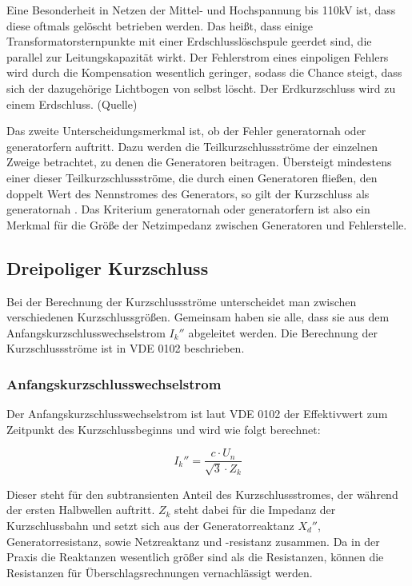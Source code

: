 \documentclass{scrartcl}
\begin{document}
\begin{onehalfspace}
Eine Besonderheit in Netzen der Mittel- und Hochspannung bis 110kV ist, dass diese oftmals gelöscht betrieben werden. Das heißt, dass einige Transformatorsternpunkte mit einer Erdschlusslöschspule geerdet sind, die parallel zur Leitungskapazität wirkt. Der Fehlerstrom eines einpoligen Fehlers wird durch die Kompensation wesentlich geringer, sodass die Chance steigt, dass sich der dazugehörige Lichtbogen von selbst löscht. Der Erdkurzschluss wird zu einem Erdschluss. (Quelle)

Das zweite Unterscheidungsmerkmal ist, ob der Fehler \glqq generatornah\grqq{} oder \glqq generatorfern\grqq{} auftritt. Dazu werden die Teilkurzschlussströme der einzelnen Zweige betrachtet, zu denen die Generatoren beitragen. Übersteigt mindestens einer dieser Teilkurzschlussströme, die durch einen Generatoren fließen, den doppelt Wert des Nennstromes des Generators, so gilt der Kurzschluss als generatornah \cite[S. 56]{Schlabbach2003}. Das Kriterium \glqq generatornah oder generatorfern\grqq{} ist also ein Merkmal für die Größe der Netzimpedanz zwischen Generatoren und Fehlerstelle. \\

\subsection{Dreipoliger Kurzschluss}
Bei der Berechnung der Kurzschlussströme unterscheidet man zwischen verschiedenen Kurzschlussgrößen. Gemeinsam haben sie alle, dass sie aus dem Anfangskurzschlusswechselstrom $I_k''$ abgeleitet werden. %
Die Berechnung der Kurzschlussströme ist in VDE 0102 beschrieben.

\subsubsection{Anfangskurzschlusswechselstrom}
Der Anfangskurzschlusswechselstrom ist laut VDE 0102 der \glqq Effektivwert zum Zeitpunkt des Kurzschlussbeginns\grqq{} und wird wie folgt berechnet:

\begin{equation}
I_k'' = \frac{c \cdot U_n}{\sqrt{3} \cdot Z_k}
\end{equation}

Dieser steht für den subtransienten Anteil des Kurzschlussstromes, der während der ersten Halbwellen auftritt. $Z_k$ steht dabei für die Impedanz der Kurzschlussbahn und setzt sich aus der Generatorreaktanz $X_d''$, Generatorresistanz, sowie Netzreaktanz und -resistanz zusammen. Da in der Praxis die Reaktanzen wesentlich größer sind als die Resistanzen, können die Resistanzen für Überschlagsrechnungen vernachlässigt werden.


\end{onehalfspace}
\end{document}
